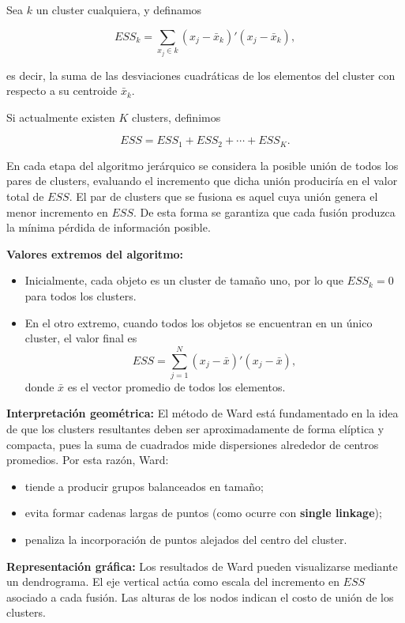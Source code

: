 \documentclass[
]{book}
\providecommand{\tightlist}{%
  \setlength{\itemsep}{0pt}\setlength{\parskip}{0pt}}
\begin{document}
Sea \(k\) un cluster cualquiera, y definamos

\[
ESS_k = \sum_{x_j \in k} (x_j - \bar{x}_k)'(x_j - \bar{x}_k),
\]

es decir, la suma de las desviaciones cuadráticas de los elementos del cluster con respecto a su centroide \(\bar{x}_k\).

Si actualmente existen \(K\) clusters, definimos

\[
ESS = ESS_1 + ESS_2 + \cdots + ESS_K.
\]

En cada etapa del algoritmo jerárquico se considera la posible unión de todos los pares de clusters, evaluando el incremento que dicha unión produciría en el valor total de \(ESS\). El par de clusters que se fusiona es aquel cuya unión genera el menor incremento en \(ESS\). De esta forma se garantiza que cada fusión produzca la mínima pérdida de información posible.

\textbf{Valores extremos del algoritmo:}

\begin{itemize}
\tightlist
\item
  Inicialmente, cada objeto es un cluster de tamaño uno, por lo que \(ESS_k = 0\) para todos los clusters.
\item
  En el otro extremo, cuando todos los objetos se encuentran en un único cluster, el valor final es
  \[
    ESS = \sum_{j=1}^N (x_j - \bar{x})'(x_j - \bar{x}),
    \]
  donde \(\bar{x}\) es el vector promedio de todos los elementos.
\end{itemize}

\textbf{Interpretación geométrica:} El método de Ward está fundamentado en la idea de que los clusters resultantes deben ser aproximadamente de forma elíptica y compacta, pues la suma de cuadrados mide dispersiones alrededor de centros promedios. Por esta razón, Ward:

\begin{itemize}
\tightlist
\item
  tiende a producir grupos balanceados en tamaño;
\item
  evita formar cadenas largas de puntos (como ocurre con \textbf{single linkage});
\item
  penaliza la incorporación de puntos alejados del centro del cluster.
\end{itemize}

\textbf{Representación gráfica:} Los resultados de Ward pueden visualizarse mediante un dendrograma. El eje vertical actúa como escala del incremento en \(ESS\) asociado a cada fusión. Las alturas de los nodos indican el costo de unión de los clusters.
\end{document}
